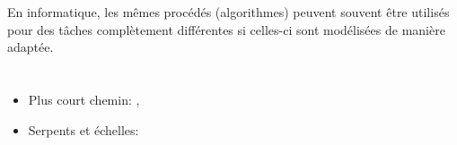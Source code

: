 {{En informatique, les mêmes procédés (algorithmes) peuvent souvent être utilisés pour des tâches complètement différentes si celles-ci sont modélisées de manière adaptée.



\section*{\BrochureWebsitesAndKeywords}
{\raggedright
\begin{itemize}
  \item Plus court chemin: \href{https://fr.wikipedia.org/wiki/Probl\%C3\%A8me_de_plus_court_chemin}{}, \href{https://fr.wikipedia.org/wiki/Algorithme_de_Dijkstra}{}
  \item Serpents et échelles: \href{https://fr.wikipedia.org/wiki/Serpents_et_\%C3\%A9chelles}{}
\end{itemize}


}

}{}

\def\AuthorPonnekantiP{} %
\def\AuthorSudharshaP{} %
\def\AuthorPhelpsM{} %
\def\AuthorPiperH{} %
\def\AuthorQuidillaS{} %
\def\AuthorGallenbacherJ{} %
\def\AuthorDatzkoS{} %
\def\AuthorPelletE{} %

\newpage}{}
